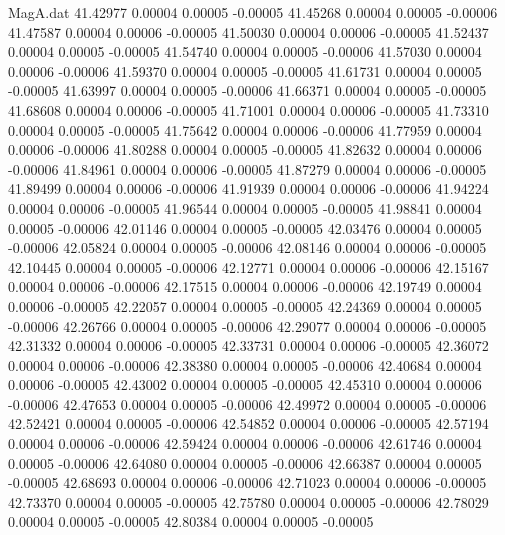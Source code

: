 \begin{filecontents}{MagA.dat}
  41.42977    0.00004    0.00005   -0.00005
  41.45268    0.00004    0.00005   -0.00006
  41.47587    0.00004    0.00006   -0.00005
  41.50030    0.00004    0.00006   -0.00005
  41.52437    0.00004    0.00005   -0.00005
  41.54740    0.00004    0.00005   -0.00006
  41.57030    0.00004    0.00006   -0.00006
  41.59370    0.00004    0.00005   -0.00005
  41.61731    0.00004    0.00005   -0.00005
  41.63997    0.00004    0.00005   -0.00006
  41.66371    0.00004    0.00005   -0.00005
  41.68608    0.00004    0.00006   -0.00005
  41.71001    0.00004    0.00006   -0.00005
  41.73310    0.00004    0.00005   -0.00005
  41.75642    0.00004    0.00006   -0.00006
  41.77959    0.00004    0.00006   -0.00006
  41.80288    0.00004    0.00005   -0.00005
  41.82632    0.00004    0.00006   -0.00006
  41.84961    0.00004    0.00006   -0.00005
  41.87279    0.00004    0.00006   -0.00005
  41.89499    0.00004    0.00006   -0.00006
  41.91939    0.00004    0.00006   -0.00006
  41.94224    0.00004    0.00006   -0.00005
  41.96544    0.00004    0.00005   -0.00005
  41.98841    0.00004    0.00005   -0.00006
  42.01146    0.00004    0.00005   -0.00005
  42.03476    0.00004    0.00005   -0.00006
  42.05824    0.00004    0.00005   -0.00006
  42.08146    0.00004    0.00006   -0.00005
  42.10445    0.00004    0.00005   -0.00006
  42.12771    0.00004    0.00006   -0.00006
  42.15167    0.00004    0.00006   -0.00006
  42.17515    0.00004    0.00006   -0.00006
  42.19749    0.00004    0.00006   -0.00005
  42.22057    0.00004    0.00005   -0.00005
  42.24369    0.00004    0.00005   -0.00006
  42.26766    0.00004    0.00005   -0.00006
  42.29077    0.00004    0.00006   -0.00005
  42.31332    0.00004    0.00006   -0.00005
  42.33731    0.00004    0.00006   -0.00005
  42.36072    0.00004    0.00006   -0.00006
  42.38380    0.00004    0.00005   -0.00006
  42.40684    0.00004    0.00006   -0.00005
  42.43002    0.00004    0.00005   -0.00005
  42.45310    0.00004    0.00006   -0.00006
  42.47653    0.00004    0.00005   -0.00006
  42.49972    0.00004    0.00005   -0.00006
  42.52421    0.00004    0.00005   -0.00006
  42.54852    0.00004    0.00006   -0.00005
  42.57194    0.00004    0.00006   -0.00006
  42.59424    0.00004    0.00006   -0.00006
  42.61746    0.00004    0.00005   -0.00006
  42.64080    0.00004    0.00005   -0.00006
  42.66387    0.00004    0.00005   -0.00005
  42.68693    0.00004    0.00006   -0.00006
  42.71023    0.00004    0.00006   -0.00005
  42.73370    0.00004    0.00005   -0.00005
  42.75780    0.00004    0.00005   -0.00006
  42.78029    0.00004    0.00005   -0.00005
  42.80384    0.00004    0.00005   -0.00005

\end{filecontents}
